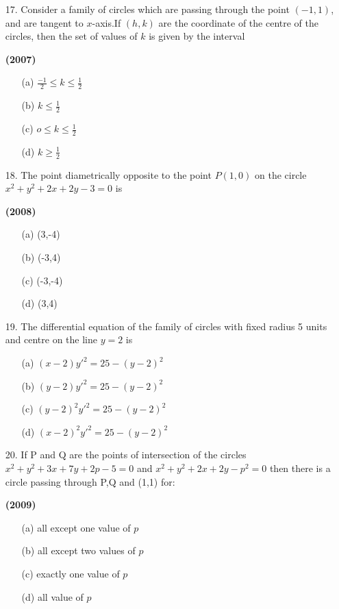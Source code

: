 \documentclass[journal,12pt,twocolumn]{IEEEtran}
\theoremstyle{remark}
\begin{document}
\begin{enumerate}
\item[17.]Consider a family of circles which are passing through the point $(-1,1)$, and are tangent to $x$-axis.If $(h,k)$ are the coordinate of the centre of the circles, then the set of values of $k$ is given by the interval

\hfill{\textbf{(2007)}}

\begin{enumerate}
\item[(a)] $\frac{-1}{2} \le k \le \frac{1}{2}$
\item[(b)] $k\le \frac{1}{2}$
\item[(c)] $o\le k \le \frac{1}{2}$
\item[(d)] $k \ge \frac{1}{2}$
\end{enumerate}
\end{enumerate}
\begin{enumerate}
\item[18.]The point diametrically opposite to the point $P(1,0)$ on the circle $x^2+y^2+2x+2y-3=0$ is 

\hfill{\textbf{(2008)}}

\begin{enumerate}
\item[(a)] (3,-4)
\item[(b)] (-3,4)
\item[(c)] (-3,-4)
\item[(d)] (3,4)
\end{enumerate}
\end{enumerate}
\begin{enumerate}
\item[19.]The differential equation of the family of circles with fixed radius 5 units and centre on the line $y=2$ is


\begin{enumerate}
\item[(a)] $(x-2)y'^2=25-(y-2)^2$
\item[(b)] $(y-2)y'^2=25-(y-2)^2$
\item[(c)] $(y-2)^2y'^2=25-(y-2)^2$
\item[(d)] $(x-2)^2y'^2=25-(y-2)^2$
\end{enumerate}
\end{enumerate}
\begin{enumerate}
\item[20.]If P and Q are the points of intersection of the circles $x^2+y^2+3x+7y+2p-5=0$ and $x^2+y^2+2x+2y-p^2=0$ then there is a circle passing through P,Q and (1,1) for:

\hfill{\textbf{(2009)}}

\begin{enumerate}
\item[(a)] all except one value of $p$
\item[(b)] all except two values of $p$
\item[(c)] exactly one value of $p$
\item[(d)] all value of $p$
\end{enumerate}
\end{enumerate}
\end{document}
